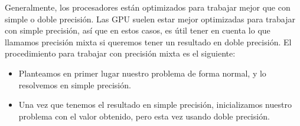 Generalmente, los procesadores están optimizados para trabajar mejor que con simple o doble precisión. Las GPU suelen estar mejor optimizadas para trabajar con simple precisión, así que en estos casos, es útil tener en cuenta lo que llamamos precisión mixta si queremos tener un resultado en doble precisión. El procedimiento para trabajar con precisión mixta es el siguiente:

\begin{itemize}
	\item Planteamos en primer lugar nuestro problema de forma normal, y lo resolvemos en simple precisión.
	\item Una vez que tenemos el resultado en simple precisión, inicializamos nuestro problema con el valor obtenido, pero esta vez usando doble precisión.
\end{itemize}

